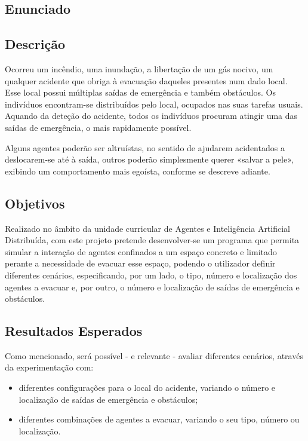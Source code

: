 \documentclass[12pt]{article}
\begin{document}
\begin{titlepage}

\section{Enunciado}

\subsection{Descrição}

Ocorreu um incêndio, uma inundação, a libertação de um gás nocivo, um qualquer acidente que obriga à evacuação daqueles presentes num dado local. Esse local possui múltiplas saídas de emergência e também obstáculos. Os indivíduos encontram-se distribuídos pelo local, ocupados nas suas tarefas usuais. Aquando da deteção do acidente, todos os indivíduos procuram atingir uma das saídas de emergência, o mais rapidamente possível.

Alguns agentes poderão ser altruístas, no sentido de ajudarem acidentados a deslocarem-se até à saída, outros poderão simplesmente querer «salvar a pele», exibindo um comportamento mais egoísta, conforme se descreve adiante.


\subsection{Objetivos}

Realizado no âmbito da unidade curricular de Agentes e Inteligência Artificial Distribuída, com este projeto pretende desenvolver-se um programa que permita simular a interação de agentes confinados a um espaço concreto e limitado perante a necessidade de evacuar esse espaço, podendo o utilizador definir diferentes cenários, especificando, por um lado, o tipo, número e localização dos agentes a evacuar e, por outro, o número e localização de saídas de emergência e obstáculos.


\subsection{Resultados Esperados}

Como mencionado, será possível - e relevante - avaliar diferentes cenários, através da experimentação com:
\begin{itemize}
	\item diferentes configurações para o local do acidente, variando o número e localização de saídas de emergência e obstáculos;
	\item diferentes combinações de agentes a evacuar, variando o seu tipo, número ou localização.
\end{itemize}


\end{titlepage}
\end{document}
